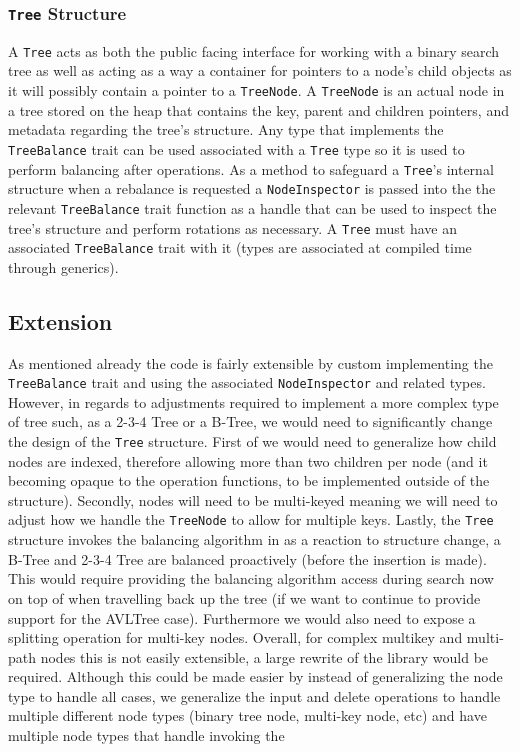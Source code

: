 \documentclass[11pt, letterpaper]{article}
\begin{document}
\subsubsection{\texttt{Tree} Structure}
A \texttt{Tree} acts as both the public facing interface for working with a binary search tree as well as
acting as a way a container for pointers to a node's child objects as it will possibly contain
a pointer to a \texttt{TreeNode}.  A \texttt{TreeNode} is an actual node in a tree stored on the heap that contains the
key, parent and children pointers, and metadata regarding the tree's structure.  Any type that implements the \texttt{TreeBalance} trait
can be used associated with a \texttt{Tree} type so it is used to perform balancing after operations.
As a method to safeguard a \texttt{Tree}'s internal structure when a rebalance is requested a \texttt{NodeInspector} is passed into the
the relevant \texttt{TreeBalance} trait function as a handle that can be used to inspect the tree's structure and perform rotations as necessary.
A \texttt{Tree} must have an associated \texttt{TreeBalance} trait with it (types are associated at compiled time through generics).

\subsection{Extension}
As mentioned already the code is fairly extensible by custom implementing the \texttt{TreeBalance} trait and using the associated
\texttt{NodeInspector} and related types.  However, in regards to adjustments required to implement a more complex type of tree such, as a 2-3-4 Tree or a B-Tree,
we would need to significantly change the design of the \texttt{Tree} structure.  First of we would need to generalize how child nodes are indexed, therefore allowing
more than two children per node (and it becoming opaque to the operation functions, to be implemented outside of the structure).
Secondly, nodes will need to be multi-keyed meaning we will need to adjust how we handle the \texttt{TreeNode} to allow for multiple keys.
Lastly, the \texttt{Tree} structure invokes the balancing algorithm in as a reaction to structure change, a B-Tree and 2-3-4 Tree are balanced
proactively (before the insertion is made).  This would require providing the balancing algorithm access during search now on top of when travelling back up the tree
(if we want to continue to provide support for the AVLTree case).  Furthermore we would also need to expose a splitting operation for multi-key nodes.
Overall, for complex multikey and multi-path nodes this is not easily extensible, a large rewrite of the library would be required.
Although this could be made easier by instead of generalizing the node type to handle all cases, we generalize the input and delete operations to handle
multiple different node types (binary tree node, multi-key node, etc) and have multiple node types that handle invoking the 
\end{document}
